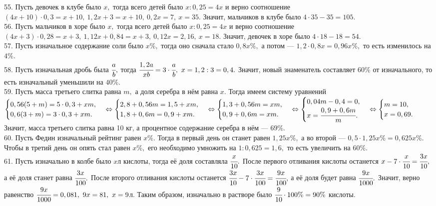 \documentclass[12pt]{article}
\begin{document}
55. Пусть девочек в клубе было $x,$ тогда всего детей было $x:0,25=4x$ и верно соотношение $(4x+10)\cdot0,3=x+10,\ 1,2x+3=x+10,\ 0,2x=7,\ x=35.$ Значит, мальчиков в клубе было $4\cdot35-35=105.$\\
56. Пусть мальчиков в хоре было $x,$ тогда всего детей было $x:0,25=4x$ и верно соотношение $(4x+3)\cdot0,28=x+3,\ 1,12x+0,84=x+3,\ 0,12x=2,16,\ x=18.$ Значит, девочек в хоре было $4\cdot18-18=54.$\\
57. Пусть изначальное содержание соли было $x\%,$ тогда оно сначала стало $0,8x\%,$ а потом --- $1,2\cdot0,8x=0,96x\%,$ то есть изменилось на $4\%.$\\
58. Пусть изначальная дробь была $\cfrac{a}{b},$ тогда $\cfrac{1,2a}{xb}=3\cdot \cfrac{a}{b},\ x=1,2:3=0,4.$ Значит, новый знаменатель составляет $60\%$ от изначального, то есть изначальный уменьшили на $40\%.$\\
59. Пусть масса третьего слитка равна $m,$ а доля серебра в нём равна $x.$ Тогда имеем систему уравнений $\begin{cases}0,56(5+m)=5\cdot0,3+xm,\\0,6(3+m)=3\cdot0,3+xm.\end{cases}\Leftrightarrow
\begin{cases}2,8+0,56m=1,5+xm,\\ 1,8+0,6m=0,9+xm.\end{cases}\Leftrightarrow
\begin{cases}1,3+0,56m=xm,\\ 0,9+0,6m=xm.\end{cases}\Leftrightarrow
\begin{cases}0,04m-0,4=0,\\ x=\cfrac{0,9+0,6m}{m}.\end{cases}\Leftrightarrow
\begin{cases}m=10,\\ x=0,69.\end{cases}$ Значит, масса третьего слитка равна 10 кг, а процентное содержание серебра в нём --- $69\%.$\\
60. Пусть Федин изначальный рейтинг равен $x\%.$ Тогда в первый день он станет равен $1,25x\%,$ а во второй --- $0,5\cdot1,25x\%=0,625x\%.$ Чтобы в третий день он опять стал равен $x\%,$ его необходимо умножить на $1:0,625=1,6,$ то есть увеличить на $60\%.$\\
61. Пусть изначально в колбе было $x$л кислоты, тогда её доля составляла $\cfrac{x}{10}.$ После первого отливания кислоты останется $x-7\cdot\cfrac{x}{10}=\cfrac{3x}{10},$ а её доля станет равна $\cfrac{3x}{100}.$ После второго отливания кислоты останется $\cfrac{3x}{10}-7\cdot\cfrac{3x}{100}=\cfrac{9x}{100},$ а её доля будет равна $\cfrac{9x}{1000}.$ Значит, верно равенство $\cfrac{9x}{1000}=0,081,\ 9x=81,\ x=9$л. Таким образом, изначально в растворе было $\cfrac{9}{10}\cdot100\%=90\%$ кислоты.\\
\end{document}
